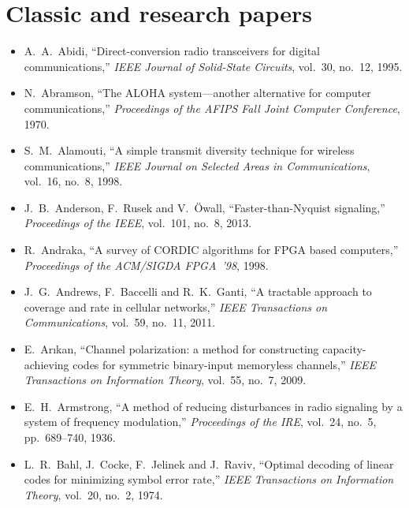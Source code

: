 \section*{Classic and research papers}
\begingroup\small
\begin{itemize}[leftmargin=1.5em,itemindent=-1.5em,itemsep=1.5pt plus 1pt,parsep=0pt,topsep=4pt,label={}]\rightskip=0pt plus 3em\relax
\item A.~A.~Abidi, ``Direct-conversion radio transceivers for digital communications,'' \emph{IEEE Journal of Solid-State Circuits}, vol.~30, no.~12, 1995.
\item N.~Abramson, ``The ALOHA system---another alternative for computer communications,'' \emph{Proceedings of the AFIPS Fall Joint Computer Conference}, 1970.
\item S.~M.~Alamouti, ``A simple transmit diversity technique for wireless communications,'' \emph{IEEE Journal on Selected Areas in Communications}, vol.~16, no.~8, 1998.
\item J.~B.~Anderson, F.~Rusek and V.~\"Owall, ``Faster-than-Nyquist signaling,'' \emph{Proceedings of the IEEE}, vol.~101, no.~8, 2013.
\item R.~Andraka, ``A survey of CORDIC algorithms for FPGA based computers,'' \emph{Proceedings of the ACM/SIGDA FPGA~'98}, 1998.
\item J.~G.~Andrews, F.~Baccelli and R.~K.~Ganti, ``A tractable approach to coverage and rate in cellular networks,'' \emph{IEEE Transactions on Communications}, vol.~59, no.~11, 2011.
\item E.~Ar\i kan, ``Channel polarization: a method for constructing capacity-achieving codes for symmetric binary-input memoryless channels,'' \emph{IEEE Transactions on Information Theory}, vol.~55, no.~7, 2009.
\item E.~H.~Armstrong, ``A method of reducing disturbances in radio signaling by a system of frequency modulation,'' \emph{Proceedings of the IRE}, vol.~24, no.~5, pp.~689--740, 1936.
\item L.~R.~Bahl, J.~Cocke, F.~Jelinek and J.~Raviv, ``Optimal decoding of linear codes for minimizing symbol error rate,'' \emph{IEEE Transactions on Information Theory}, vol.~20, no.~2, 1974.

\end{itemize}
